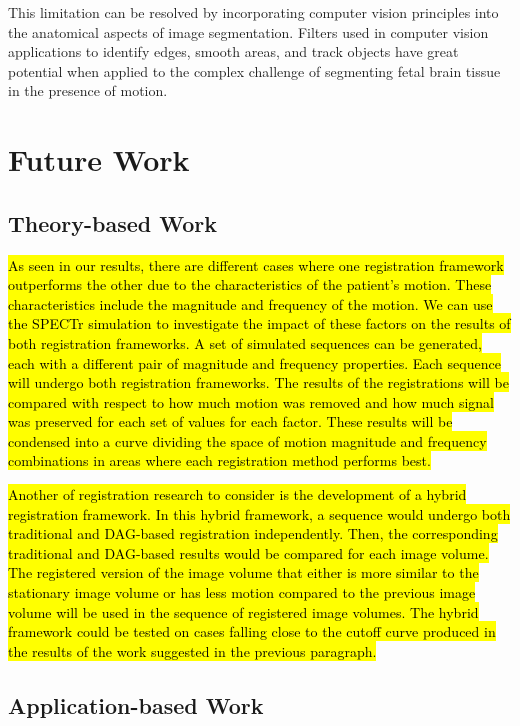 This limitation can be resolved by incorporating computer vision principles into the anatomical aspects of image segmentation. Filters used in computer vision applications to identify edges, smooth areas, and track objects have great potential when applied to the complex challenge of segmenting fetal brain tissue in the presence of motion.

\section{Future Work}

\subsection{Theory-based Work}

\hl{As seen in our results, there are different cases where one registration framework outperforms the other due to the characteristics of the patient's motion. These characteristics include the magnitude and frequency of the motion. We can use the SPECTr simulation to investigate the impact of these factors on the results of both registration frameworks. A set of simulated sequences can be generated, each with a different pair of magnitude and frequency properties. Each sequence will undergo both registration frameworks. The results of the registrations will be compared with respect to how much motion was removed and how much signal was preserved for each set of values for each factor. These results will be condensed into a curve dividing the space of motion magnitude and frequency combinations in areas where each registration method performs best.}

\hl{Another of registration research to consider is the development of a hybrid registration framework. In this hybrid framework, a sequence would undergo both traditional and DAG-based registration independently. Then, the corresponding traditional and DAG-based results would be compared for each image volume. The registered version of the image volume that either is more similar to the stationary image volume or has less motion compared to the previous image volume will be used in the sequence of registered image volumes. The hybrid framework could be tested on cases falling close to the cutoff curve produced in the results of the work suggested in the previous paragraph.}

\subsection{Application-based Work}

